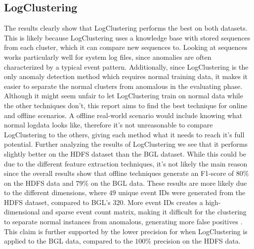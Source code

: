 \subsection{LogClustering}
The results clearly show that LogClustering performs the best on both datasets. This is likely because LogClustering uses a knowledge base with stored sequences from each cluster, which it can compare new sequences to. Looking at sequences works particularly well for system log files, since anomalies are often characterized by a typical event pattern. Additionally, since LogClustering is the only anomaly detection method which requires normal training data, it makes it easier to separate the normal clusters from anomalous in the evaluating phase. Although it might seem unfair to let LogClustering train on normal data while the other techniques don't, this report aims to find the best technique for online and offline scenarios. A offline real-world scenario would include knowing what normal logdata looks like, therefore it's not unreasonable to compare LogClustering to the others, giving each method what it needs to reach it's full potential. Further analyzing the results of LogClustering we see that it performs slightly better on the HDFS dataset than the BGL dataset. While this could be due to the different feature extraction techniques, it's not likely the main reason since the overall results show that offline techniques generate an F1-score of $80$\% on the HDFS data and $79$\% on the BGL data. These results are more likely due to the different dimensions, where $49$ unique event IDs were generated from the HDFS dataset, compared to BGL's $320$. More event IDs creates a high-dimensional and sparse event count matrix, making it difficult for the clustering to separate normal instances from anomalous, generating more false positives \cite{Shilin2017experiencereport}. This claim is further supported by the lower precision for when LogClustering is applied to the BGL data, compared to the $100$\% precision on the HDFS data.

 
